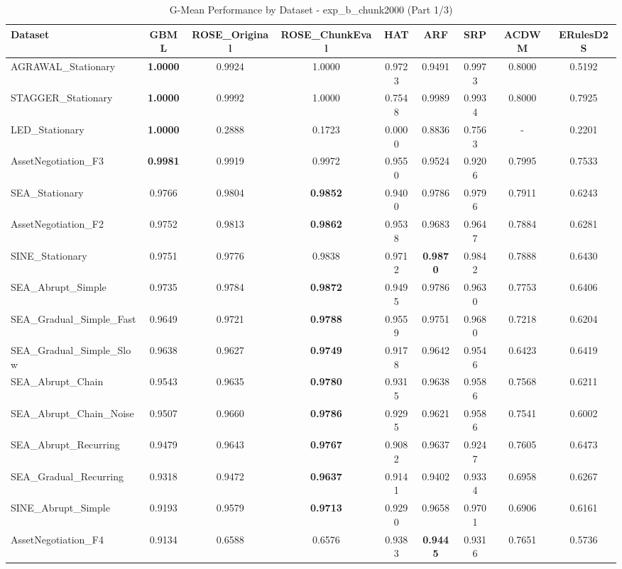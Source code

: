 \begin{table}[htbp]
\centering
\caption{G-Mean Performance by Dataset - exp_b_chunk2000 (Part 1/3)}
\label{tab:gmean_exp_b_chunk2000_1}
\footnotesize
\begin{tabular}{lcccccccc}
\toprule
Dataset & GBML & ROSE_Original & ROSE_ChunkEval & HAT & ARF & SRP & ACDWM & ERulesD2S \\
\midrule
AGRAWAL_Stationary & \textbf{1.0000} & 0.9924 & 1.0000 & 0.9723 & 0.9491 & 0.9973 & 0.8000 & 0.5192 \\
STAGGER_Stationary & \textbf{1.0000} & 0.9992 & 1.0000 & 0.7548 & 0.9989 & 0.9934 & 0.8000 & 0.7925 \\
LED_Stationary & \textbf{1.0000} & 0.2888 & 0.1723 & 0.0000 & 0.8836 & 0.7563 & - & 0.2201 \\
AssetNegotiation_F3 & \textbf{0.9981} & 0.9919 & 0.9972 & 0.9550 & 0.9524 & 0.9206 & 0.7995 & 0.7533 \\
SEA_Stationary & 0.9766 & 0.9804 & \textbf{0.9852} & 0.9400 & 0.9786 & 0.9796 & 0.7911 & 0.6243 \\
AssetNegotiation_F2 & 0.9752 & 0.9813 & \textbf{0.9862} & 0.9538 & 0.9683 & 0.9647 & 0.7884 & 0.6281 \\
SINE_Stationary & 0.9751 & 0.9776 & 0.9838 & 0.9712 & \textbf{0.9870} & 0.9842 & 0.7888 & 0.6430 \\
SEA_Abrupt_Simple & 0.9735 & 0.9784 & \textbf{0.9872} & 0.9495 & 0.9786 & 0.9630 & 0.7753 & 0.6406 \\
SEA_Gradual_Simple_Fast & 0.9649 & 0.9721 & \textbf{0.9788} & 0.9559 & 0.9751 & 0.9680 & 0.7218 & 0.6204 \\
SEA_Gradual_Simple_Slow & 0.9638 & 0.9627 & \textbf{0.9749} & 0.9178 & 0.9642 & 0.9546 & 0.6423 & 0.6419 \\
SEA_Abrupt_Chain & 0.9543 & 0.9635 & \textbf{0.9780} & 0.9315 & 0.9638 & 0.9586 & 0.7568 & 0.6211 \\
SEA_Abrupt_Chain_Noise & 0.9507 & 0.9660 & \textbf{0.9786} & 0.9295 & 0.9621 & 0.9586 & 0.7541 & 0.6002 \\
SEA_Abrupt_Recurring & 0.9479 & 0.9643 & \textbf{0.9767} & 0.9082 & 0.9637 & 0.9247 & 0.7605 & 0.6473 \\
SEA_Gradual_Recurring & 0.9318 & 0.9472 & \textbf{0.9637} & 0.9141 & 0.9402 & 0.9334 & 0.6958 & 0.6267 \\
SINE_Abrupt_Simple & 0.9193 & 0.9579 & \textbf{0.9713} & 0.9290 & 0.9658 & 0.9701 & 0.6906 & 0.6161 \\
AssetNegotiation_F4 & 0.9134 & 0.6588 & 0.6576 & 0.9383 & \textbf{0.9445} & 0.9316 & 0.7651 & 0.5736 \\

\end{tabular}
\end{table}
